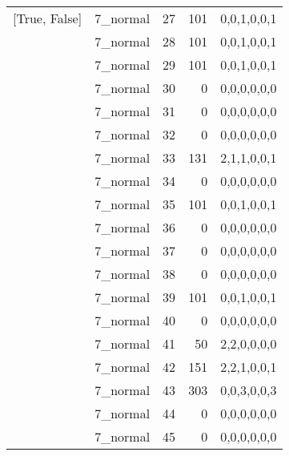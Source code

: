 \begin{tabular}{llrrl}
 [True, False]   & 7\_normal            &            27 &                   101 & 0,0,1,0,0,1   \\
 [True, False]   & 7\_normal            &            28 &                   101 & 0,0,1,0,0,1   \\
 [True, False]   & 7\_normal            &            29 &                   101 & 0,0,1,0,0,1   \\
 [True, False]   & 7\_normal            &            30 &                     0 & 0,0,0,0,0,0   \\
 [True, False]   & 7\_normal            &            31 &                     0 & 0,0,0,0,0,0   \\
 [True, False]   & 7\_normal            &            32 &                     0 & 0,0,0,0,0,0   \\
 [True, False]   & 7\_normal            &            33 &                   131 & 2,1,1,0,0,1   \\
 [True, False]   & 7\_normal            &            34 &                     0 & 0,0,0,0,0,0   \\
 [True, False]   & 7\_normal            &            35 &                   101 & 0,0,1,0,0,1   \\
 [True, False]   & 7\_normal            &            36 &                     0 & 0,0,0,0,0,0   \\
 [True, False]   & 7\_normal            &            37 &                     0 & 0,0,0,0,0,0   \\
 [True, False]   & 7\_normal            &            38 &                     0 & 0,0,0,0,0,0   \\
 [True, False]   & 7\_normal            &            39 &                   101 & 0,0,1,0,0,1   \\
 [True, False]   & 7\_normal            &            40 &                     0 & 0,0,0,0,0,0   \\
 [True, False]   & 7\_normal            &            41 &                    50 & 2,2,0,0,0,0   \\
 [True, False]   & 7\_normal            &            42 &                   151 & 2,2,1,0,0,1   \\
 [True, False]   & 7\_normal            &            43 &                   303 & 0,0,3,0,0,3   \\
 [True, False]   & 7\_normal            &            44 &                     0 & 0,0,0,0,0,0   \\
 [True, False]   & 7\_normal            &            45 &                     0 & 0,0,0,0,0,0   \\

\end{tabular}
